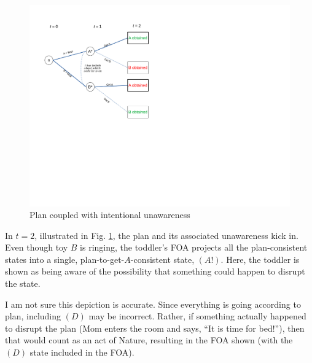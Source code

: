 \documentclass[
11pt,
titlepage,
reqno,
]{article}%
\theoremstyle{definition}
\begin{document}
\begin{figure}[h!]
	\centering
	\includegraphics*[page=19,trim = 0in 4in 1in 0in,scale=.65]{Awareness_Diagrams_All}
	\caption{Plan coupled with intentional unawareness\label{Diag: p-19}}%
\end{figure}

In $t=2$, illustrated in Fig. \ref{Diag: p-19}, the plan and its associated unawareness kick in. Even though toy $B$ is ringing, the toddler's FOA projects all the plan-consistent states into a single, plan-to-get-$A$-consistent state, $(A!)$. Here, the toddler is shown as being aware of the possibility that something could happen to disrupt the state. 

I am not sure this depiction is accurate. Since everything is going according to plan, including $(D)$ may be incorrect. Rather, if something actually happened to disrupt the plan (Mom enters the room and says, ``It is time for bed!''), then that would count as an act of Nature, resulting in the FOA shown (with the $(D)$ state included in the FOA). 
\end{document}
